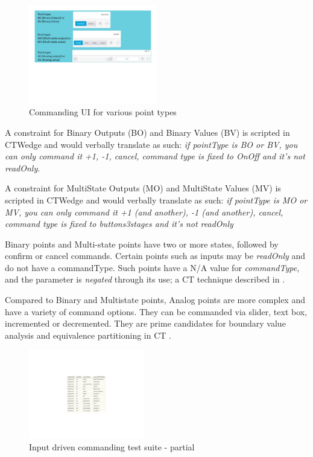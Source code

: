 \documentclass[conference]{IEEEtran}
\begin{document}
	\begin{figure}[!t]
		\includegraphics[width=0.50\textwidth,]{modelCommanding.pdf}
		\caption{Commanding UI for various point types}
		\label{fig:modelCommanding}
	\end{figure} 

	A constraint for Binary Outputs (BO) and Binary Values (BV) is scripted in CTWedge and would verbally translate as such:
	\textit{if pointType is BO or BV, you can only command it +1, -1, cancel, command type is fixed to OnOff and it's not readOnly}.
	
	A constraint for MultiState Outputs (MO) and MultiState Values (MV) is scripted in CTWedge and would verbally translate as such:
	\textit{if pointType is MO or MV, you can only command it +1 (and another), -1 (and another), cancel, command type is fixed to buttons3stages and it's not readOnly}

	Binary points and Multi-state points have two or more states, followed by confirm or cancel commands. 
	Certain points such as inputs may be \textit{readOnly} and do not have a commandType. Such points have a N/A value for \textit{commandType}, and the parameter is \textit{negated} through its use; a CT technique described in \cite{segall2012common}.	

	Compared to  Binary and Multistate points, Analog points are more complex and have a variety of command options.
	They can be commanded via slider, text box, incremented or decremented. 
	They are prime candidates for boundary value analysis and equivalence partitioning in CT \cite{segall2012common}.

	\begin{figure}[!t]
		\includegraphics[width=0.45\textwidth,]{csvOutputCommanding.pdf}
		\caption{Input driven commanding test suite - partial}
		\label{fig:csvOutputCommanding}
	\end{figure}
\end{document}
